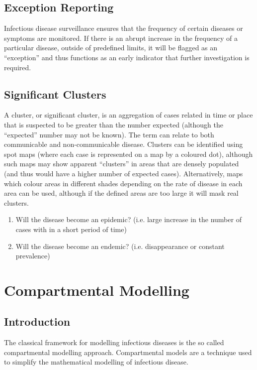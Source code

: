 \documentclass[fontsize=17pt]{article}
\begin{document}
\subsection{Exception Reporting}

Infectious disease surveillance ensures that the frequency of certain diseases or symptoms are monitored. If there is an abrupt increase in the frequency of a particular disease, outside of predefined limits, it will be flagged as an “exception” and thus functions as an early indicator that further investigation is required.


\subsection{Significant Clusters}

A cluster, or significant cluster, is an aggregation of cases related in time or place that is suspected to be greater than the number expected (although the “expected” number may not be known). The term can relate to both communicable and non-communicable disease. Clusters can be identified using spot maps (where each case is represented on a map by a coloured dot), although such maps may show apparent “clusters” in areas that are densely populated (and thus would have a higher number of expected cases). Alternatively, maps which colour areas in different shades depending on the rate of disease in each area can be used, although if the defined areas are too large it will mask real clusters.

\begin{enumerate}
	\item Will the disease become an epidemic? (i.e. large increase in the number of cases with in a short period of time)
	\item Will the disease become an endemic? (i.e. disappearance or constant prevalence) 
\end{enumerate} 


\section{Compartmental Modelling}
\subsection{Introduction}
The classical framework for modelling infectious diseases is the so called compartmental modelling approach. Compartmental models are a technique used to simplify the mathematical modelling of infectious disease. 
\end{document}
